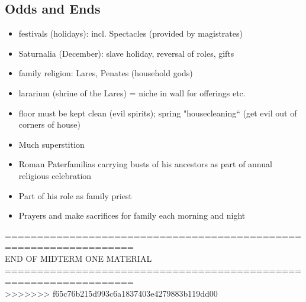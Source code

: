 \documentclass[12pt, twoside]{article}
\begin{document}
\subsection{Odds and Ends}
\begin{itemize}
\item festivals (holidays): incl. Spectacles (provided by magistrates)
\item Saturnalia (December): slave holiday, reversal of roles, gifts
\item family religion: Lares, Penates (household gods)
\item lararium (shrine of the Lares) = niche in wall for offerings etc.
\item floor must be kept clean (evil spirits); spring "housecleaning“ (get evil out of corners of house)
\item Much superstition
\item Roman Paterfamilias carrying busts of his ancestors as part of annual religious celebration
\item Part of his role as family priest
\item Prayers and make sacrifices for family each morning and night
\end{itemize}

================================================================== \\
END OF MIDTERM ONE MATERIAL \\
================================================================== \\

>>>>>>> f65c76b215d993c6a1837403e4279883b119dd00
\end{document}
